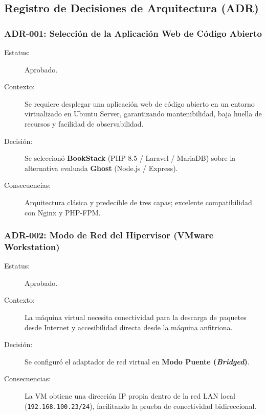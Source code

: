 \documentclass[12pt,a4paper]{article}
\begin{document}
\subsection{Registro de Decisiones de Arquitectura (ADR)}

\subsubsection{ADR-001: Selección de la Aplicación Web de Código Abierto}
\begin{description}
    \item[Estatus:] Aprobado.
    \item[Contexto:] Se requiere desplegar una aplicación web de código abierto en un entorno virtualizado en Ubuntu Server, garantizando mantenibilidad, baja huella de recursos y facilidad de observabilidad.
    \item[Decisión:] Se seleccionó \textbf{BookStack} (PHP 8.5 / Laravel / MariaDB) sobre la alternativa evaluada \textbf{Ghost} (Node.js / Express).
    \item[Consecuencias:] Arquitectura clásica y predecible de tres capas; excelente compatibilidad con Nginx y PHP-FPM.
\end{description}

\subsubsection{ADR-002: Modo de Red del Hipervisor (VMware Workstation)}
\begin{description}
    \item[Estatus:] Aprobado.
    \item[Contexto:] La máquina virtual necesita conectividad para la descarga de paquetes desde Internet y accesibilidad directa desde la máquina anfitriona.
    \item[Decisión:] Se configuró el adaptador de red virtual en \textbf{Modo Puente (\textit{Bridged})}.
    \item[Consecuencias:] La VM obtiene una dirección IP propia dentro de la red LAN local (\texttt{192.168.100.23/24}), facilitando la prueba de conectividad bidireccional.
\end{description}
\end{document}
